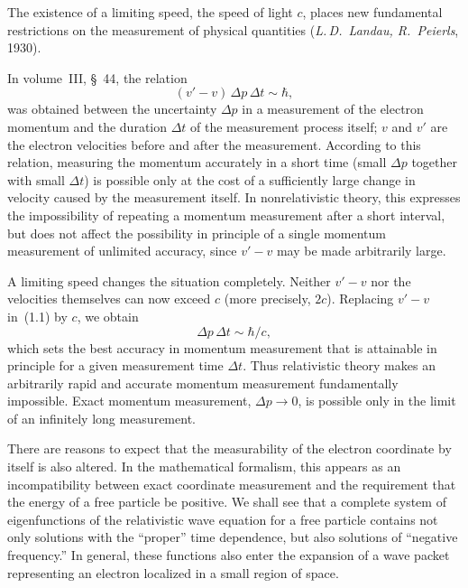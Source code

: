 The existence of a limiting speed, the speed of light $c$, places new fundamental restrictions on the measurement of physical quantities (\emph{L.\,D.~Landau, R.~Peierls}, 1930).

In volume~III, \S~44, the relation
\begin{equation}
(v' - v)\,\Delta p\,\Delta t \sim \hbar,
\tag{1.1}
\end{equation}
was obtained between the uncertainty $\Delta p$ in a measurement of the electron momentum and the duration $\Delta t$ of the measurement process itself; $v$ and $v'$ are the electron velocities before and after the measurement. According to this relation, measuring the momentum accurately in a short time (small $\Delta p$ together with small $\Delta t$) is possible only at the cost of a sufficiently large change in velocity caused by the measurement itself. In nonrelativistic theory, this expresses the impossibility of repeating a momentum measurement after a short interval, but does not affect the possibility in principle of a single momentum measurement of unlimited accuracy, since $v' - v$ may be made arbitrarily large.

A limiting speed changes the situation completely. Neither $v' - v$ nor the velocities themselves can now exceed $c$ (more precisely, $2c$). Replacing $v' - v$ in~(1.1) by $c$, we obtain
\begin{equation}
\Delta p\,\Delta t \sim \hbar/c,
\tag{1.2}
\end{equation}
which sets the best accuracy in momentum measurement that is attainable in principle for a given measurement time $\Delta t$. Thus relativistic theory makes an arbitrarily rapid and accurate momentum measurement fundamentally impossible. Exact momentum measurement, $\Delta p \to 0$, is possible only in the limit of an infinitely long measurement.

There are reasons to expect that the measurability of the electron coordinate by itself is also altered. In the mathematical formalism, this appears as an incompatibility between exact coordinate measurement and the requirement that the energy of a free particle be positive. We shall see that a complete system of eigenfunctions of the relativistic wave equation for a free particle contains not only solutions with the ``proper'' time dependence, but also solutions of ``negative frequency.'' In general, these functions also enter the expansion of a wave packet representing an electron localized in a small region of space.

